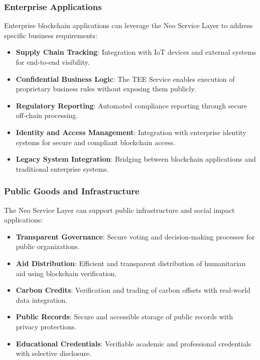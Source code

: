 \subsubsection{Enterprise Applications}
\label{subsubsec:enterprise}

Enterprise blockchain applications can leverage the Neo Service Layer to address specific business requirements:

\begin{itemize}
    \item \textbf{Supply Chain Tracking}: Integration with IoT devices and external systems for end-to-end visibility.
    
    \item \textbf{Confidential Business Logic}: The TEE Service enables execution of proprietary business rules without exposing them publicly.
    
    \item \textbf{Regulatory Reporting}: Automated compliance reporting through secure off-chain processing.
    
    \item \textbf{Identity and Access Management}: Integration with enterprise identity systems for secure and compliant blockchain access.
    
    \item \textbf{Legacy System Integration}: Bridging between blockchain applications and traditional enterprise systems.
\end{itemize}

\subsubsection{Public Goods and Infrastructure}
\label{subsubsec:public-goods}

The Neo Service Layer can support public infrastructure and social impact applications:

\begin{itemize}
    \item \textbf{Transparent Governance}: Secure voting and decision-making processes for public organizations.
    
    \item \textbf{Aid Distribution}: Efficient and transparent distribution of humanitarian aid using blockchain verification.
    
    \item \textbf{Carbon Credits}: Verification and trading of carbon offsets with real-world data integration.
    
    \item \textbf{Public Records}: Secure and accessible storage of public records with privacy protections.
    
    \item \textbf{Educational Credentials}: Verifiable academic and professional credentials with selective disclosure.
\end{itemize}

